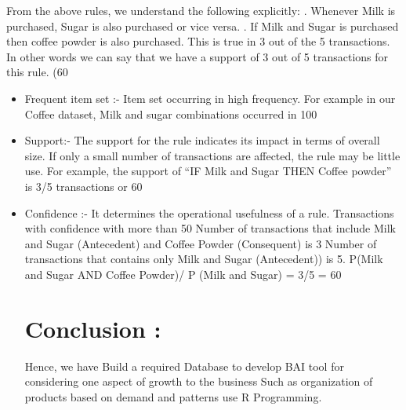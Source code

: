 \documentclass[a4paper,12pt]{article}
\begin{document}
{{From the above rules, we understand the following explicitly:
.	Whenever Milk is purchased, Sugar is also purchased or vice versa. 
.	If Milk and Sugar is purchased then coffee powder is also purchased. This is true in 3 out of the 5 transactions. In other words we can say that we have a support of 3 out of 5 transactions for this rule. (60%

\begin{itemize}
\item Frequent item set :- Item set occurring in high frequency. For example in our Coffee dataset, Milk and sugar combinations occurred in 100%
\item Support:-  The support for the rule indicates its impact in terms of overall size.  If only a small number of transactions are affected, the rule may be little use. For example, the support of “IF Milk and Sugar THEN Coffee powder” is 3/5 transactions or 60%
\item Confidence :- It determines the operational usefulness of a rule. Transactions with confidence with more than 50%
Number of transactions that include Milk and Sugar (Antecedent) and Coffee Powder (Consequent) is 3
Number of transactions that contains only Milk and Sugar (Antecedent)) is 5.
\newline
P(Milk and Sugar AND Coffee Powder)/ P (Milk and Sugar)  =  3/5 = 60%

\section{Conclusion : }

Hence, we have  Build a required Database to develop BAI tool for considering one aspect of growth to the business Such as organization of products based on demand and patterns use R Programming.

\end{itemize}

}}
\end{document}
